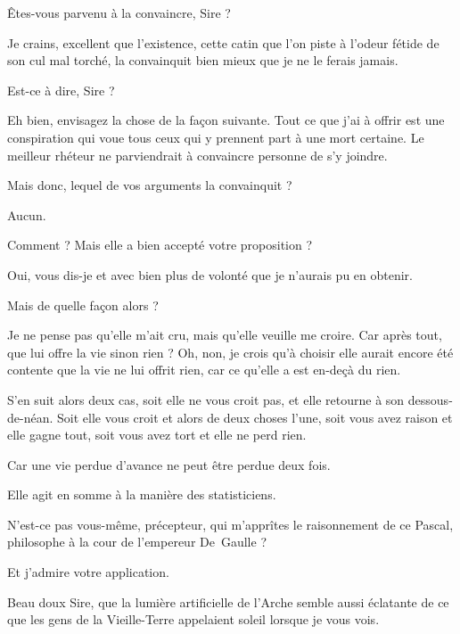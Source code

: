 \begin{drama}
  \alexasspeaks Êtes-vous parvenu à la convaincre, Sire ?

  \elenaspeaks Je crains, excellent \alexas que l’existence, cette catin que l’on piste à l’odeur fétide de son cul mal torché, la convainquit bien mieux que je ne le ferais jamais.

  \alexasspeaks Est-ce à dire, Sire ?

  \elenaspeaks Eh bien, envisagez la chose de la façon suivante. Tout ce que j’ai à offrir est une conspiration qui voue tous ceux qui y prennent part à une mort certaine. Le meilleur rhéteur ne parviendrait à convaincre personne de s’y joindre. 

  \alexasspeaks Mais donc, lequel de vos arguments la convainquit ?

  \elenaspeaks Aucun.

  \alexasspeaks Comment ? Mais elle a bien accepté votre proposition ?

  \elenaspeaks Oui, vous dis-je et avec bien plus de volonté que je n’aurais pu en obtenir.

  \alexasspeaks Mais de quelle façon alors ?

  \elenaspeaks Je ne pense pas qu’elle m’ait cru, mais qu’elle veuille me croire. Car après tout, que lui offre la vie sinon rien ? Oh, non, je crois qu’à choisir elle aurait encore été contente que la vie ne lui offrit rien, car ce qu’elle a est en-deçà du rien. 

  \alexasspeaks S’en suit alors deux cas, soit elle ne vous croit pas, et elle retourne à son dessous-de-néan. Soit elle vous croit et alors de deux choses l’une, soit vous avez raison et elle gagne tout, soit vous avez tort et elle ne perd rien.

  \alexasspeaks Car une vie perdue d’avance ne peut être perdue deux fois.

  \alexasspeaks Elle agit en somme à la manière des statisticiens.

  \elenaspeaks N’est-ce pas vous-même, précepteur, qui m’apprîtes le raisonnement de ce Pascal, philosophe à la cour de l’empereur De~Gaulle ?

  \alexasspeaks Et j’admire votre application.

  \intrat{\general}

  \generalspeaks Beau doux Sire, que la lumière artificielle de l’Arche semble aussi éclatante de ce que les gens de la Vieille-Terre appelaient soleil lorsque je vous vois.


\end{drama}
